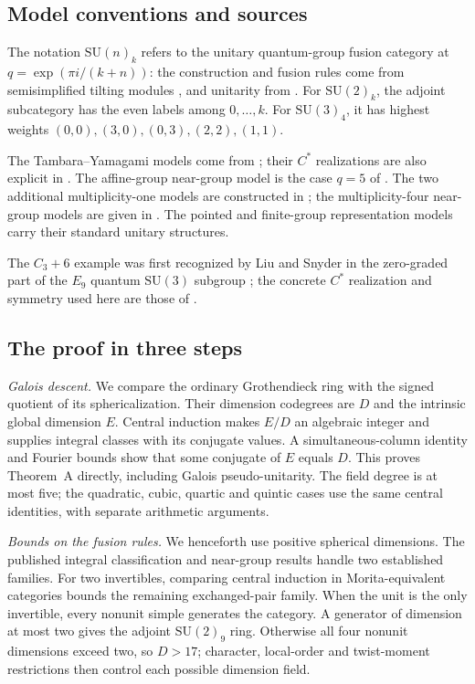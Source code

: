 \documentclass[11pt,a4paper]{article}
\numberwithin{equation}{section}
\begin{document}
\subsection*{Model conventions and sources}
The notation $\mathrm{SU}(n)_k$ refers to the unitary quantum-group
fusion category at $q=\exp(\pi i/(k+n))$: the construction and fusion
rules come from semisimplified tilting modules
\cite{AndersenParadowski}, and unitarity from \cite{Wenzl}.
For $\mathrm{SU}(2)_k$, the adjoint subcategory has the even labels
among $0,\ldots,k$. For $\mathrm{SU}(3)_4$, it has highest weights
$(0,0),(3,0),(0,3),(2,2),(1,1)$.

The Tambara--Yamagami models come from \cite{TambaraYamagami};
their $C^*$ realizations are also explicit in
\cite[Corollary~4]{EvansGannon}. The affine-group near-group model
is the case $q=5$ of \cite[\S4.1]{Siehler}.
The two additional multiplicity-one models are constructed in
\cite[\S\S4.2 and~4.4]{LPR}; the multiplicity-four near-group
models are given in \cite[Examples~9.5--9.6]{Izumi}.
The pointed and finite-group representation models carry their
standard unitary structures.

The $C_3+6$ example was first recognized by Liu and Snyder in the
zero-graded part of the $E_9$ quantum $\mathrm{SU}(3)$ subgroup
\cite[\S10, Remark preceding Definition~10.1]{LiuYB};
the concrete $C^*$ realization and symmetry used here are those of
\cite[Theorem~10.19, Lemma~13.1 and Example~13.10]{Izumi}.

\subsection*{The proof in three steps}
\emph{Galois descent.}
We compare the ordinary Grothendieck ring with the signed quotient of
its sphericalization. Their dimension codegrees are $D$ and the
intrinsic global dimension $E$. Central induction makes $E/D$ an
algebraic integer \cite[Propositions~8.21--8.22]{ENO} and supplies integral classes with its conjugate
values. A simultaneous-column identity and Fourier bounds show that
some conjugate of $E$ equals $D$. This proves Theorem~A directly,
including Galois pseudo-unitarity. The field degree is at most five;
the quadratic, cubic, quartic and quintic cases use the same central
identities, with separate arithmetic arguments.

\emph{Bounds on the fusion rules.}
We henceforth use positive spherical dimensions. The published
integral classification \cite{ABDP} and near-group results
\cite{SchNG,MengYu} handle two established families.
For two invertibles, comparing central induction in Morita-equivalent
categories bounds the remaining exchanged-pair family. When the unit
is the only invertible, every nonunit simple generates the category.
A generator of dimension at most two gives the adjoint
$\mathrm{SU}(2)_9$ ring. Otherwise all four nonunit dimensions exceed
two, so $D>17$; character, local-order and twist-moment restrictions
then control each possible dimension field.
\end{document}
